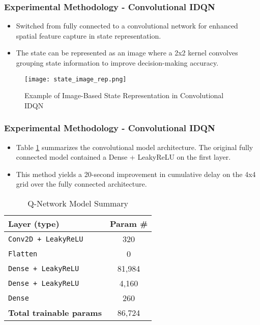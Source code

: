 \documentclass[compress,12pt]{beamer}
\begin{document}
\begin{frame}[bg=arguelles.png]
      \frametitle{Experimental Methodology - Convolutional IDQN}
      \begin{itemize}
        \item Switched from fully connected to a convolutional network for enhanced spatial feature capture in state representation.
        \item The state can be represented as an image where a 2x2 kernel convolves grouping state information to improve decision-making accuracy.
      \end{itemize}

      \begin{figure}[htbp]
        \centering
        \texttt{[image: state\_image\_rep.png]}
        \caption{Example of Image-Based State Representation in Convolutional IDQN}
        \label{fig:state_image_rep}
      \end{figure}
\end{frame}
\begin{frame}[bg=arguelles.png]
      \frametitle{Experimental Methodology - Convolutional IDQN}
      \begin{itemize}
        \item Table \ref{tab:model_summary} summarizes the convolutional model architecture. The original fully connected model contained a Dense + LeakyReLU on the first layer.
        \item This method yields a 20-second improvement in cumulative delay on the 4x4 grid over the fully connected architecture.
      \end{itemize}

      \begin{table}[h]
      \centering
      \begin{tabular}{lc}
      \hline
      \textbf{Layer (type)}              & \textbf{Param \#} \\ \hline
      \texttt{Conv2D + LeakyReLU}        & 320       \\
      \texttt{Flatten}                   & 0         \\
      \texttt{Dense + LeakyReLU}         & 81,984    \\
      \texttt{Dense + LeakyReLU}         & 4,160     \\
      \texttt{Dense}                     & 260       \\ \hline
      \textbf{Total trainable params}    & 86,724    \\ \hline
      \end{tabular}
      \caption{Q-Network Model Summary}
      \label{tab:model_summary}
      \end{table}

\end{frame}
\end{document}

